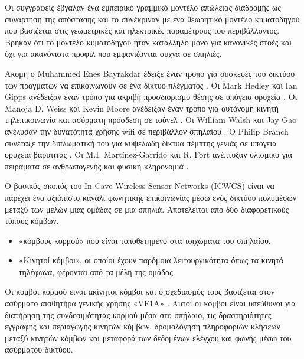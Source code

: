 \documentclass[12pt]{article}
\begin{document}
\begin{multicols*}{2}
        Οι συγγραφείς έβγαλαν ένα εμπειρικό γραμμικό μοντέλο απώλειας διαδρομής ως συνάρτηση
        της απόστασης και το συνέκριναν με ένα θεωρητικό μοντέλο κυματοδηγού που βασίζεται στις
        γεωμετρικές και ηλεκτρικές παραμέτρους του περιβάλλοντος. Βρήκαν ότι το μοντέλο κυματοδηγού
        ήταν κατάλληλο μόνο για κανονικές στοές και όχι για ακανόνιστα προφίλ που εμφανίζονται
        συχνά σε σπηλιές.
        
        

        Ακόμη ο Muhammed Enes Bayrakdar έδειξε έναν τρόπο για
        συσκευές του δικτύου των πραγμάτων να επικοινωνούν σε ένα δίκτυο πλέγματος
        \cite{bayrakdar_rule_2019}. Οι Mark Hedley και Ian Gipps ανέδειξαν έναν τρόπο για
        ακριβή προσδιορισμό θέσης σε υπόγεια ορυχεία \cite{hedley_accurate_2013}. Οι
        Manoja D. Weiss και Kevin Moore ανέδειξαν έναν τρόπο για αυτόνομη κινητή
        τηλεπικοινωνία και ασύρματη πρόσδεση σε τούνελ \cite{weiss_autonomous_2009}. Οι
        William Walsh και Jay Gao ανέλυσαν την δυνατότητα χρήσης wifi σε περιβάλλον
        σπηλαίου \cite{walsh_communications_2018}. Ο Philip Branch συνέταξε την
        διπλωματική του για κυψελωδη δίκτυα πέμπτης γενιάς σε υπόγεια ορυχεία βαρύτιτας
        \cite{branch_fifth_2021}. Οι M.I. Martínez-Garrido και R. Fort ανέπτυξαν υλισμικό
        για πειράματα σε ανθρωπογενής και φυσική κληρονομιά
        \cite{martinez-garrido_experimental_2016}.

        Ο βασικός σκοπός του In-Cave Wireless
        Sensor Networks (ICWCS) είναι να παρέχει ένα αξιόπιστο κανάλι φωνητικής επικοινωνίας
        μέσω ενός δικτύου πολυμέσων μεταξύ των μελών μιας ομάδας σε μια σπηλιά. Αποτελείται
        από δύο διαφορετικούς τύπους κόμβων. 
        \begin{itemize}
            \item «κόμβους κορμού» που είναι τοποθετημένο στα τοιχώματα του σπηλαίου.
            \item «Κινητοί κόμβοι», οι οποίοι έχουν παρόμοια λειτουργικότητα όπως τα κινητά
            τηλέφωνα, φέρονται από τα μέλη της ομάδας.
        \end{itemize}

        Οι κόμβοι κορμού είναι ακίνητοι
        κόμβοι και ο σχεδιασμός τους βασίζεται στον ασύρματο αισθητήρα γενικής
        χρήσης «VF1A» \cite*{walsh_communications_2018}.
        Αυτοί οι κόμβοι είναι υπεύθυνοι για διατήρηση της συνδεσιμότητας κορμού μέσα 
        στο σπήλαιο, τις δραστηριότητες
        εγγραφής και περιαγωγής κινητών κόμβων, δρομολόγηση πληροφοριών κλήσεων μεταξύ
        κινητών κόμβων και μεταφορά των δεδομένων ελέγχου και φωνής μέσω του ασύρματου
        δικτύου.


\end{multicols*}
\end{document}
